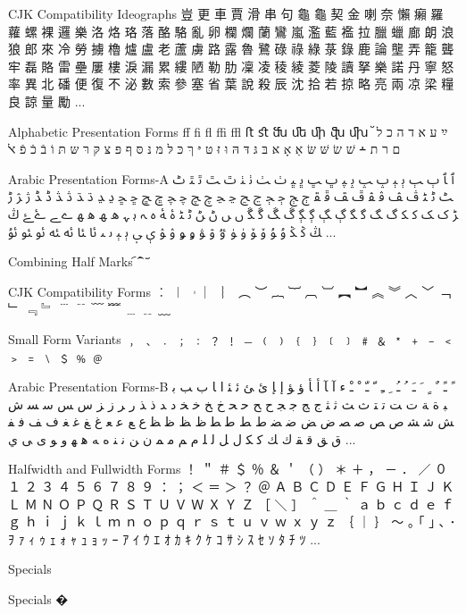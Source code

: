 \documentclass[12pt,twoside]{memoir}
\begin{document}
CJK Compatibility Ideographs
豈 更 車 賈 滑 串 句 龜 龜 契 金 喇 奈 懶 癩 羅 蘿 螺 裸 邏 樂 洛 烙 珞 落 酪 駱 亂 卵 欄 爛 蘭 鸞 嵐 濫 藍 襤 拉 臘 蠟 廊 朗 浪 狼 郎 來 冷 勞 擄 櫓 爐 盧 老 蘆 虜 路 露 魯 鷺 碌 祿 綠 菉 錄 鹿 論 壟 弄 籠 聾 牢 磊 賂 雷 壘 屢 樓 淚 漏 累 縷 陋 勒 肋 凜 凌 稜 綾 菱 陵 讀 拏 樂 諾 丹 寧 怒 率 異 北 磻 便 復 不 泌 數 索 參 塞 省 葉 說 殺 辰 沈 拾 若 掠 略 亮 兩 凉 梁 糧 良 諒 量 勵 ...

Alphabetic Presentation Forms
ﬀ ﬁ ﬂ ﬃ ﬄ ﬅ ﬆ ﬓ ﬔ ﬕ ﬖ ﬗ ﬞ ײַ ﬠ ﬡ ﬢ ﬣ ﬤ ﬥ ﬦ ﬧ ﬨ ﬩ שׁ שׂ שּׁ שּׂ אַ אָ אּ בּ גּ דּ הּ וּ זּ טּ יּ ךּ כּ לּ מּ נּ סּ ףּ פּ צּ קּ רּ שּ תּ וֹ בֿ כֿ פֿ ﭏ

Arabic Presentation Forms-A
ﭐ ﭑ ﭒ ﭓ ﭔ ﭕ ﭖ ﭗ ﭘ ﭙ ﭚ ﭛ ﭜ ﭝ ﭞ ﭟ ﭠ ﭡ ﭢ ﭣ ﭤ ﭥ ﭦ ﭧ ﭨ ﭩ ﭪ ﭫ ﭬ ﭭ ﭮ ﭯ ﭰ ﭱ ﭲ ﭳ ﭴ ﭵ ﭶ ﭷ ﭸ ﭹ ﭺ ﭻ ﭼ ﭽ ﭾ ﭿ ﮀ ﮁ ﮂ ﮃ ﮄ ﮅ ﮆ ﮇ ﮈ ﮉ ﮊ ﮋ ﮌ ﮍ ﮎ ﮏ ﮐ ﮑ ﮒ ﮓ ﮔ ﮕ ﮖ ﮗ ﮘ ﮙ ﮚ ﮛ ﮜ ﮝ ﮞ ﮟ ﮠ ﮡ ﮢ ﮣ ﮤ ﮥ ﮦ ﮧ ﮨ ﮩ ﮪ ﮫ ﮬ ﮭ ﮮ ﮯ ﮰ ﮱ ﯓ ﯔ ﯕ ﯖ ﯗ ﯘ ﯙ ﯚ ﯛ ﯜ ﯝ ﯞ ﯟ ﯠ ﯡ ﯢ ﯣ ﯤ ﯥ ﯦ ﯧ ﯨ ﯩ ﯪ ﯫ ﯬ ﯭ ﯮ ﯯ ﯰ ...

Combining Half Marks
︠ ︡ ︢ ︣

CJK Compatibility Forms
︰ ︱ ︲ ︳ ︴ ︵ ︶ ︷ ︸ ︹ ︺ ︻ ︼ ︽ ︾ ︿ ﹀ ﹁ ﹂ ﹃ ﹄ ﹉ ﹊ ﹋ ﹌ ﹍ ﹎ ﹏

Small Form Variants
﹐ ﹑ ﹒ ﹔ ﹕ ﹖ ﹗ ﹘ ﹙ ﹚ ﹛ ﹜ ﹝ ﹞ ﹟ ﹠ ﹡ ﹢ ﹣ ﹤ ﹥ ﹦ ﹨ ﹩ ﹪ ﹫

Arabic Presentation Forms-B
ﹰ ﹱ ﹲ ﹴ ﹶ ﹷ ﹸ ﹹ ﹺ ﹻ ﹼ ﹽ ﹾ ﹿ ﺀ ﺁ ﺂ ﺃ ﺄ ﺅ ﺆ ﺇ ﺈ ﺉ ﺊ ﺋ ﺌ ﺍ ﺎ ﺏ ﺐ ﺑ ﺒ ﺓ ﺔ ﺕ ﺖ ﺗ ﺘ ﺙ ﺚ ﺛ ﺜ ﺝ ﺞ ﺟ ﺠ ﺡ ﺢ ﺣ ﺤ ﺥ ﺦ ﺧ ﺨ ﺩ ﺪ ﺫ ﺬ ﺭ ﺮ ﺯ ﺰ ﺱ ﺲ ﺳ ﺴ ﺵ ﺶ ﺷ ﺸ ﺹ ﺺ ﺻ ﺼ ﺽ ﺾ ﺿ ﻀ ﻁ ﻂ ﻃ ﻄ ﻅ ﻆ ﻇ ﻈ ﻉ ﻊ ﻋ ﻌ ﻍ ﻎ ﻏ ﻐ ﻑ ﻒ ﻓ ﻔ ﻕ ﻖ ﻗ ﻘ ﻙ ﻚ ﻛ ﻜ ﻝ ﻞ ﻟ ﻠ ﻡ ﻢ ﻣ ﻤ ﻥ ﻦ ﻧ ﻨ ﻩ ﻪ ﻫ ﻬ ﻭ ﻮ ﻯ ﻰ ﻱ ...

Halfwidth and Fullwidth Forms
！ ＂ ＃ ＄ ％ ＆ ＇ （ ） ＊ ＋ ， － ． ／ ０ １ ２ ３ ４ ５ ６ ７ ８ ９ ： ； ＜ ＝ ＞ ？ ＠ Ａ Ｂ Ｃ Ｄ Ｅ Ｆ Ｇ Ｈ Ｉ Ｊ Ｋ Ｌ Ｍ Ｎ Ｏ Ｐ Ｑ Ｒ Ｓ Ｔ Ｕ Ｖ Ｗ Ｘ Ｙ Ｚ ［ ＼ ］ ＾ ＿ ｀ ａ ｂ ｃ ｄ ｅ ｆ ｇ ｈ ｉ ｊ ｋ ｌ ｍ ｎ ｏ ｐ ｑ ｒ ｓ ｔ ｕ ｖ ｗ ｘ ｙ ｚ ｛ ｜ ｝ ～ ｡ ｢ ｣ ､ ･ ｦ ｧ ｨ ｩ ｪ ｫ ｬ ｭ ｮ ｯ ｰ ｱ ｲ ｳ ｴ ｵ ｶ ｷ ｸ ｹ ｺ ｻ ｼ ｽ ｾ ｿ ﾀ ﾁ ﾂ ...

Specials
﻿

Specials
�
\end{document}
